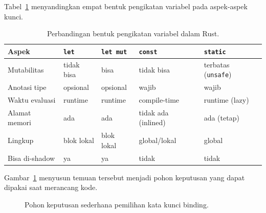 \documentclass[11pt,a4paper]{article}
\begin{document}
Tabel~\ref{tab:comparison} menyandingkan empat bentuk pengikatan variabel pada aspek-aspek kunci.

\begin{table}[H]
	\centering
	\caption{Perbandingan bentuk pengikatan variabel dalam Rust.}
	\label{tab:comparison}
	\scriptsize
	\setlength{\tabcolsep}{3pt}
	\renewcommand{\arraystretch}{1.2}
	\begin{tabularx}{\textwidth}{l >{\raggedright\arraybackslash}X >{\raggedright\arraybackslash}X >{\raggedright\arraybackslash}X >{\raggedright\arraybackslash}X}
		\toprule
		Aspek          & \texttt{let} & \texttt{let mut} & \texttt{const}      & \texttt{static}            \\
		\midrule
		Mutabilitas    & tidak bisa   & bisa             & tidak bisa          & terbatas (\texttt{unsafe}) \\
		Anotasi tipe   & opsional     & opsional         & wajib               & wajib                      \\
		Waktu evaluasi & runtime      & runtime          & compile-time        & runtime (lazy)             \\
		Alamat memori  & ada          & ada              & tidak ada (inlined) & ada (tetap)                \\
		Lingkup        & blok lokal   & blok lokal       & global/lokal        & global                     \\
		Bisa di-shadow & ya           & ya               & tidak               & tidak                      \\
		\bottomrule
	\end{tabularx}
\end{table}

Gambar~\ref{fig:decision} menyusun temuan tersebut menjadi pohon keputusan yang dapat dipakai saat merancang kode.

\begin{figure}[H]
	\centering
	\caption{Pohon keputusan sederhana pemilihan kata kunci binding.}
	\label{fig:decision}
\end{figure}
\end{document}
